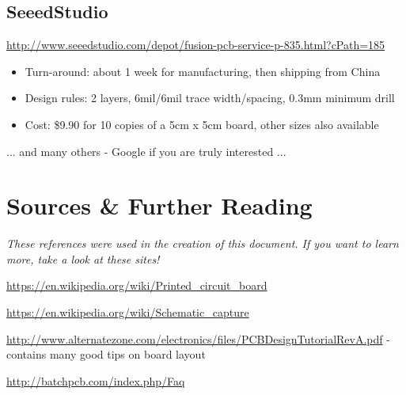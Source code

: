 \documentclass[letterpaper]{article}
\newcommand\textstyleSubtleEmphasis[1]{\textit{\textcolor[rgb]{0.5019608,0.5019608,0.5019608}{#1}}}
\newcommand\liststyleRTFNumiii{%
\renewcommand\labelitemi{{\textbullet}}
\renewcommand\labelitemii{o}
\renewcommand\labelitemiii{${\blacksquare}$}
\renewcommand\labelitemiv{{\textbullet}}
}
\begin{document}
\subsection{SeeedStudio}
\hypertarget{Toc337742716}{}{\sffamily\color[rgb]{0.30980393,0.5058824,0.7411765}
\url{http://www.seeedstudio.com/depot/fusion-pcb-service-p-835.html?cPath=185} }

\liststyleRTFNumiii
\begin{itemize}
\item {\sffamily\color[rgb]{0.30980393,0.5058824,0.7411765}
Turn-around: about 1 week for manufacturing, then shipping from China}
\item {\sffamily\color[rgb]{0.30980393,0.5058824,0.7411765}
Design rules: 2 layers, 6mil/6mil trace width/spacing, 0.3mm minimum drill}
\item {\sffamily\color[rgb]{0.30980393,0.5058824,0.7411765}
Cost: \$9.90 for 10 copies of a 5cm x 5cm board, other sizes also available}
\end{itemize}

\bigskip

{\sffamily\color[rgb]{0.30980393,0.5058824,0.7411765}
... and many others - Google if you are truly interested ...}

\section{Sources \& Further Reading}
\hypertarget{Toc337742717}{}{\sffamily\color[rgb]{0.30980393,0.5058824,0.7411765}
\textstyleSubtleEmphasis{These references were used in the creation of this document. If you want to learn more, take a
look at these sites!}}


\bigskip

{\sffamily\color[rgb]{0.30980393,0.5058824,0.7411765}
\url{https://en.wikipedia.org/wiki/Printed_circuit_board}}

{\sffamily\color[rgb]{0.30980393,0.5058824,0.7411765}
\url{https://en.wikipedia.org/wiki/Schematic_capture}}

{\sffamily\color[rgb]{0.30980393,0.5058824,0.7411765}
\url{http://www.alternatezone.com/electronics/files/PCBDesignTutorialRevA.pdf} - contains many good tips on board
layout}

{\sffamily\color[rgb]{0.30980393,0.5058824,0.7411765}
\url{http://batchpcb.com/index.php/Faq}}


\bigskip
\end{document}
